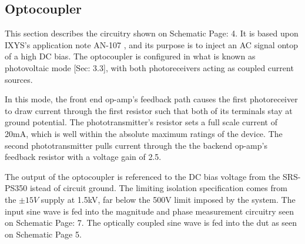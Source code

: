 \subsection{Optocoupler}
\label{sec:opto}

This section describes the circuitry shown on Schematic Page: 4. It is based upon IXYS's application note AN-107 \cite{locAppNote}, and its purpose is to inject an AC signal ontop of a high DC bias. The optocoupler is configured in what is known as photovoltaic mode \cite{locAppNote}[Sec: 3.3], with both photoreceivers acting as coupled current sources.

In this mode, the front end op-amp's feedback path causes the first photoreceiver to draw current through the first resistor such that both of its terminals stay at ground potential. The phototransmitter's resistor sets a full scale current of 20mA, which is well within the absolute maximum ratings of the device. The second phototransmitter pulls current through the the backend op-amp's feedback resistor with a voltage gain of 2.5.

The output of the optocoupler is referenced to the DC bias voltage from the SRS-PS350 istead of circuit ground. The limiting isolation specification comes from the $\pm 15V$ supply at 1.5kV, far below the 500V limit imposed by the system. The input sine wave is fed into the magnitude and phase measurement circuitry seen on Schematic Page: 7. The optically coupled sine wave is fed into the \gls{dut} as seen on Schematic Page 5.

